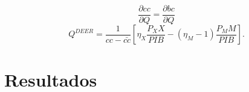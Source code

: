 \documentclass[12pt]{beamer}
\begin{document}
\begin{frame}
\begin{equation}
\frac{\partial cc}{\partial Q}=\frac{\partial bc}{\partial Q}
\end{equation}
\begin{equation}
Q^{DEER}=\frac{1}{cc-\bar{cc}}\left[\eta_X \frac{P_X X}{PIB}-(\eta_M -1)\frac{P_M M}{PIB}\right].
\end{equation}
\end{frame}

\section[Resultados]{Resultados}
\end{document}
